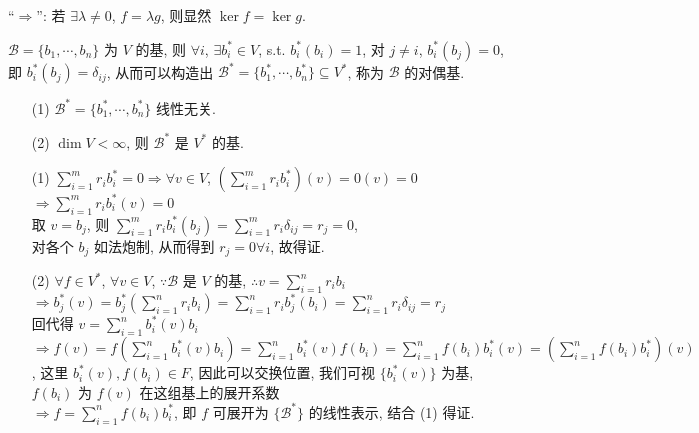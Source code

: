 \documentclass{note}
\begin{document}
\begin{pf}
\begin{itemize}
        ``$\Longrightarrow$'': 若 $\exists\lambda\neq 0$, $f=\lambda g$, 则显然 $\ker f=\ker g$.
    \end{itemize}
\end{pf}

\begin{df}[对偶基]
    $\mathcal{B}=\{b_1,\cdots,b_n\}$ 为 $V$ 的基, 则 $\forall i$, $\exists b_i^*\in V$, s.t. $b_i^*(b_i)=1$, 对 $j\neq i$, $b_i^*(b_j)=0$, 即 $b_i^*(b_j)=\delta_{ij}$, 从而可以构造出 $\mathcal{B}^*=\{b_1^*,\cdots,b_n^*\}\subseteq V^*$, 称为 $\mathcal{B}$ 的对偶基.
\end{df}

\begin{thm}[(课本定理 3.12)]
    \begin{itemize}
        \item[(1)] $\mathcal{B}^*=\{b_1^*,\cdots,b_n^*\}$ 线性无关.
        \item[(2)] $\dim V<\infty$, 则 $\mathcal{B}^*$ 是 $V^*$ 的基.
    \end{itemize}
\end{thm}
\begin{pf}
    \begin{itemize}
        \item[(1)] $\sum_{i=1}^mr_ib_i^*=0\Longrightarrow\forall v\in V$, $\left(\sum_{i=1}^mr_ib_i^*\right)(v)=0(v)=0$\\
        $\Longrightarrow\sum_{i=1}^mr_ib_i^*(v)=0$\\
        取 $v=b_j$, 则 $\sum_{i=1}^mr_ib_i^*(b_j)=\sum_{i=1}^mr_i\delta_{ij}=r_j=0$,\\
        对各个 $b_j$ 如法炮制, 从而得到 $r_j=0\forall i$, 故得证.
        \item[(2)] $\forall f\in V^*$, $\forall v\in V$, $\because\mathcal{B}$ 是 $V$ 的基, $\therefore v=\sum_{i=1}^nr_ib_i$\\
        $\Longrightarrow b_j^*(v)=b_j^*\left(\sum_{i=1}^nr_ib_i\right)=\sum_{i=1}^nr_ib_j^*(b_i)=\sum_{i=1}^nr_i\delta_{ij}=r_j$\\
        回代得 $v=\sum_{i=1}^nb_i^*(v)b_i$\\
        $\Longrightarrow f(v)=f\left(\sum_{i=1}^nb_i^*(v)b_i\right)=\sum_{i=1}^nb_i^*(v)f(b_i)=\sum_{i=1}^nf(b_i)b_i^*(v)=\left(\sum_{i=1}^nf(b_i)b_i^*\right)(v)$, 这里 $b_i^*(v),f(b_i)\in F$, 因此可以交换位置, 我们可视 $\{b_i^*(v)\}$ 为基, $f(b_i)$ 为 $f(v)$ 在这组基上的展开系数\\
        $\Longrightarrow f=\sum_{i=1}^nf(b_i)b_i^*$, 即 $f$ 可展开为 $\{\mathcal{B}^*\}$ 的线性表示, 结合 (1) 得证.
    \end{itemize}
\end{pf}
\end{document}
